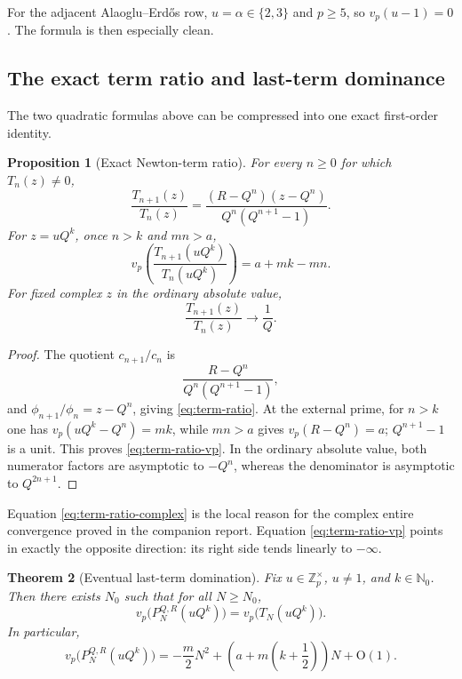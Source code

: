\documentclass[11pt,oneside]{article}
\newtheorem{theorem}{Theorem}[section]
\newtheorem{proposition}[theorem]{Proposition}
\theoremstyle{definition}
\newcommand{\Nzero}{\mathbb N_0}
\newcommand{\Z}{\mathbb Z}
\newcommand{\vp}{v_p}
\newcommand{\bigO}{\mathrm O}
\newcommand{\AEconj}{Alaoglu--Erd\H{o}s}
\begin{document}
For the adjacent \AEconj{} row, $u=\alpha\in\{2,3\}$ and $p\ge5$, so
$\vp(u-1)=0$.  The formula is then especially clean.

\subsection{The exact term ratio and last-term dominance}

The two quadratic formulas above can be compressed into one exact first-order identity.

\begin{proposition}[Exact Newton-term ratio]\label{prop:term-ratio}
For every $n\ge0$ for which $T_n(z)\ne0$,
\begin{equation}\label{eq:term-ratio}
 \frac{T_{n+1}(z)}{T_n(z)}
 =\frac{(R-Q^n)(z-Q^n)}{Q^n(Q^{n+1}-1)}.
\end{equation}
For $z=uQ^k$, once $n>k$ and $mn>a$,
\begin{equation}\label{eq:term-ratio-vp}
 \vp\left(\frac{T_{n+1}(uQ^k)}{T_n(uQ^k)}\right)
 =a+mk-mn.
\end{equation}
For fixed complex $z$ in the ordinary absolute value,
\begin{equation}\label{eq:term-ratio-complex}
 \frac{T_{n+1}(z)}{T_n(z)}\longrightarrow\frac1Q.
\end{equation}
\end{proposition}

\begin{proof}
The quotient $c_{n+1}/c_n$ is
\[
 \frac{R-Q^n}{Q^n(Q^{n+1}-1)},
\]
and $\phi_{n+1}/\phi_n=z-Q^n$, giving \eqref{eq:term-ratio}.  At the external prime, for
$n>k$ one has $\vp(uQ^k-Q^n)=mk$, while $mn>a$ gives
$\vp(R-Q^n)=a$; $Q^{n+1}-1$ is a unit.  This proves
\eqref{eq:term-ratio-vp}.  In the ordinary absolute value, both numerator factors are
asymptotic to $-Q^n$, whereas the denominator is asymptotic to $Q^{2n+1}$.
\end{proof}

Equation \eqref{eq:term-ratio-complex} is the local reason for the complex entire convergence
proved in the companion report.  Equation \eqref{eq:term-ratio-vp} points in exactly the
opposite direction: its right side tends linearly to $-\infty$.

\begin{theorem}[Eventual last-term domination]\label{thm:last-term}
Fix $u\in\Z_p^\times$, $u\ne1$, and $k\in\Nzero$.  Then there exists $N_0$ such that for all
$N\ge N_0$,
\begin{equation}\label{eq:last-term}
 \vp\bigl(P_N^{Q,R}(uQ^k)\bigr)
 =\vp\bigl(T_N(uQ^k)\bigr).
\end{equation}
In particular,
\begin{equation}\label{eq:PN-offray-asymptotic}
 \vp\bigl(P_N^{Q,R}(uQ^k)\bigr)
 =-\frac m2N^2+
 \left(a+m\left(k+\frac12\right)\right)N+\bigO(1).
\end{equation}
\end{theorem}
\end{document}

